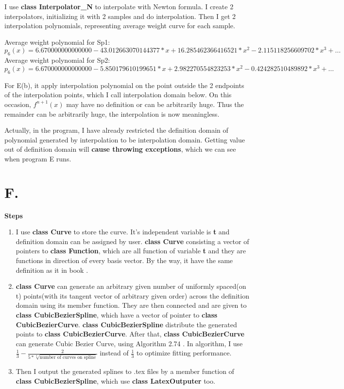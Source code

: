 \documentclass[a4paper]{article}
\begin{document}
I use \textbf{class Interpolator\_N} to interpolate with Newton formula. 
I create 2 interpolators, initializing it with 2 samples and do interpolation. 
Then I get 2 interpolation polynomials, representing average weight curve for each sample.

Average weight polynomial for Sp1: 
$$p_6(x)=6.670000000000000 - 43.012663070144377*x + 16.285462366416521*x^2 - 2.115118256609702*x^3 + \ldots$$
Average weight polynomial for Sp2: 
$$p_6(x)=6.670000000000000 - 5.850179610199651*x + 2.982270554823253*x^2 - 0.424282510489892*x^3 + \ldots$$

For E(b), it apply interpolation polynomial on the point outside the 2 endpoints of the interpolation points, 
which I call interpolation domain below. 
On this occasion, $f^{n+1}(x)$ may have no definition or can be arbitrarily huge. 
Thus the remainder can be arbitrarily huge, the interpolation is now meaningless.

Actually, in the program, I have already restricted the definition domain of polynomial generated by interpolation to be interpolation domain. 
Getting value out of definition domain will \textbf{cause throwing exceptions}, which we can see when program E runs.

\section*{F.}

\textbf{\large Steps}
\begin{enumerate}
  \item I use \textbf{class Curve} to store the curve. 
  It's independent variable is \textbf{t} and definition domain can be assigned by user. 
  \textbf{class Curve} consisting a vector of pointers to \textbf{class Function}, 
  which are all function of variable \textbf{t} and they are functions in direction of every basis vector.
  By the way, it have the same definition as it in book \cite{Curves}.

  \item \textbf{class Curve} can generate an arbitrary given number of uniformly spaced(on t) points(with its tangent vector of arbitrary given order) across the definition domain
  using its member function. They are then connected and are given to \textbf{class CubicBezierSpline}, which have a 
  vector of pointer to \textbf{class CubicBezierCurve}. \textbf{class CubicBezierSpline} distribute the generated points to 
  \textbf{class CubicBezierCurve}. After that, \textbf{class CubicBezierCurve} can generate Cubic Bezier Curve, 
  using Algorithm 2.74 \cite{Algorithm2.74}. 
  In algorithm, I use $\frac{1}{3}-\frac{2}{5*\sqrt[4]{\text{number of curves on spline}}}$ instead of $\frac{1}{3}$ to optimize fitting performance.

  \item Then I output the generated splines to .tex files by a member function of \textbf{class CubicBezierSpline}, 
  which use \textbf{class LatexOutputer} too.
\end{enumerate}
  
\end{document}
